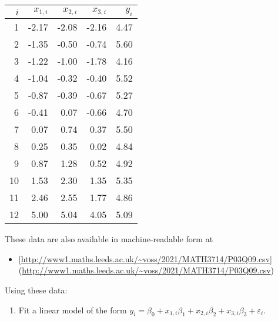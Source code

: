 \documentclass[
  a4paper,
]{article}
\providecommand{\tightlist}{%
  \setlength{\itemsep}{0pt}\setlength{\parskip}{0pt}}
\theoremstyle{definition}
\theoremstyle{definition}
\theoremstyle{definition}
\theoremstyle{definition}
\theoremstyle{remark}
\begin{document}
\begin{longtable}[]{@{}rrrrr@{}}
\toprule
\(i\) & \(x_{1,i}\) & \(x_{2,i}\) & \(x_{3,i}\) & \(y_i\) \\
\midrule
\endhead
1 & -2.17 & -2.08 & -2.16 & 4.47 \\
2 & -1.35 & -0.50 & -0.74 & 5.60 \\
3 & -1.22 & -1.00 & -1.78 & 4.16 \\
4 & -1.04 & -0.32 & -0.40 & 5.52 \\
5 & -0.87 & -0.39 & -0.67 & 5.27 \\
6 & -0.41 & 0.07 & -0.66 & 4.70 \\
7 & 0.07 & 0.74 & 0.37 & 5.50 \\
8 & 0.25 & 0.35 & 0.02 & 4.84 \\
9 & 0.87 & 1.28 & 0.52 & 4.92 \\
10 & 1.53 & 2.30 & 1.35 & 5.35 \\
11 & 2.46 & 2.55 & 1.77 & 4.86 \\
12 & 5.00 & 5.04 & 4.05 & 5.09 \\
\bottomrule
\end{longtable}

These data are also available in machine-readable form at

\begin{itemize}
\tightlist
\item
  {[}\url{http://www1.maths.leeds.ac.uk/~voss/2021/MATH3714/P03Q09.csv}{]}(\url{http://www1.maths.leeds.ac.uk/~voss/2021/MATH3714/P03Q09.csv})
\end{itemize}

Using these data:

\begin{enumerate}
\def\labelenumi{\alph{enumi}.}
\tightlist
\item
  Fit a linear model of the form
  \(y_i = \beta_0 + x_{1,i} \beta_1 + x_{2,i} \beta_2 + x_{3,i} \beta_3 + \varepsilon_i\).
\end{enumerate}
\end{document}
